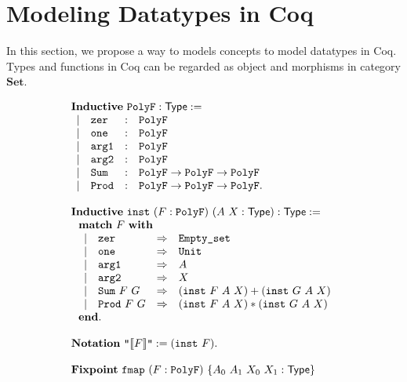 \documentclass[runningheads, orivec]{llncs}
\begin{document}
\section{Modeling Datatypes in Coq}

In this section, we propose a way to models concepts to model datatypes in Coq. Types and functions in Coq can be regarded as object and morphisms in category \( \mathbf{Set} \). 

\begin{figure}[tbhp]
\[
\begin{array}{l}
\mathbf{Inductive}~\verb~PolyF~ : \mathsf{Type} := \\
\begin{array}{llll}
| & \verb~zer~ &:& \verb~PolyF~ \\
| & \verb~one~ &:& \verb~PolyF~ \\
| & \verb~arg1~ &:& \verb~PolyF~ \\
| & \verb~arg2~ &:& \verb~PolyF~ \\
| & \verb~Sum~ &:& \verb~PolyF~ \to \verb~PolyF~ \to \verb~PolyF~ \\
| & \verb~Prod~ &:& \verb~PolyF~ \to \verb~PolyF~ \to \verb~PolyF~ .
\end{array}\\
\\
\mathbf{Inductive}~\verb~inst~~(F : \verb~PolyF~)~(A~X : \mathsf{Type}) : \mathsf{Type} := \\
~~ \mathbf{match}~F~\mathbf{with}\\
~~ \begin{array}{llll}
| & \verb~zer~ &\Rightarrow& \verb~Empty_set~ \\
| & \verb~one~ &\Rightarrow& \verb~Unit~ \\
| & \verb~arg1~ &\Rightarrow& A \\
| & \verb~arg2~ &\Rightarrow& X \\
| & \verb~Sum~~F~G &\Rightarrow& (\verb~inst~~F~A~X) + (\verb~inst~~G~A~X) \\
| & \verb~Prod~~F~G &\Rightarrow& (\verb~inst~~F~A~X) * (\verb~inst~~G~A~X)
\end{array}\\
~~\mathbf{end}.\\
\\
\mathbf{Notation}~\verb~"~ \llbracket F \rrbracket \verb~"~ := (\verb~inst~~F).\\
\\
\mathbf{Fixpoint}~\verb~fmap~~(F : \verb~PolyF~)~\{A_0~A_1~X_0~X_1 : \mathsf{Type}\}\\

\end{array}\]
\end{figure}
\end{document}

